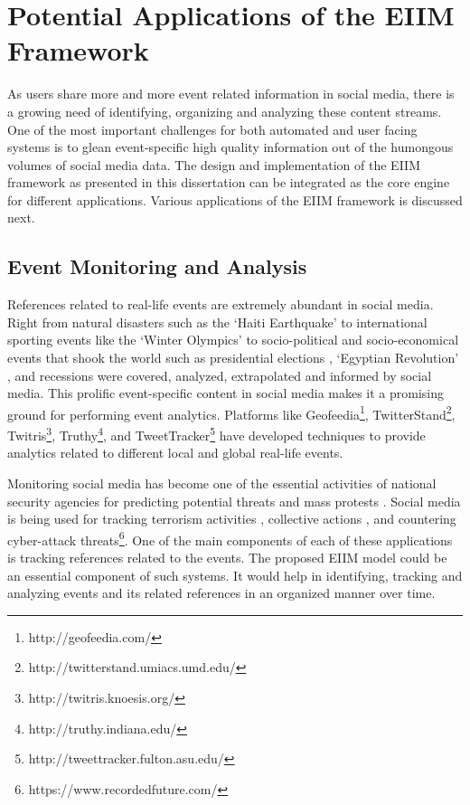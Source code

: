 
\chapter{Potential Applications of the EIIM Framework} %

\label{applications} %

\doublespacing
\setlength{\parindent}{1cm}

As users share more and more event related information in social media, there is a growing need of identifying, organizing and analyzing these content streams. One of the most important challenges for both automated and user facing systems is to glean event-specific high quality information out of the humongous volumes of social media data. The design and implementation of the EIIM framework as presented in this dissertation can be integrated as the core engine for different applications. Various applications of the EIIM framework is discussed next.


\section{Event Monitoring and Analysis}
References related to real-life events are extremely abundant in social media. Right from natural disasters such as the `Haiti Earthquake' \cite{gao2011harnessing} to international sporting events like the `Winter Olympics' \cite{walker2013russia} to socio-political \cite{singh2010mining} and socio-economical \cite{bollen2009modeling} events that shook the world such as presidential elections \cite{metzgar2009social}, `Egyptian Revolution' \cite{choudhary2012social}, and recessions were covered, analyzed, extrapolated and informed by social media. This prolific event-specific content in social media makes it a promising ground for performing event analytics. Platforms like Geofeedia\footnote{http://geofeedia.com/}, TwitterStand\footnote{http://twitterstand.umiacs.umd.edu/}, Twitris\footnote{http://twitris.knoesis.org/}, Truthy\footnote{http://truthy.indiana.edu/}, and TweetTracker\footnote{http://tweettracker.fulton.asu.edu/}  have developed techniques to provide analytics related to different local and global real-life events. 

Monitoring social media has become one of the essential activities of national security agencies for predicting potential threats and mass protests \cite{ghannam2011social}. Social media is being used for tracking terrorism activities \cite{oh2011information}, collective actions \cite{agarwal2014online}, and countering cyber-attack threats\footnote{https://www.recordedfuture.com/}. One of the main components of each of these applications is tracking references related to the events. The proposed EIIM model could be an essential component of such systems. It would help in identifying, tracking and analyzing events and its related references in an organized manner over time.



